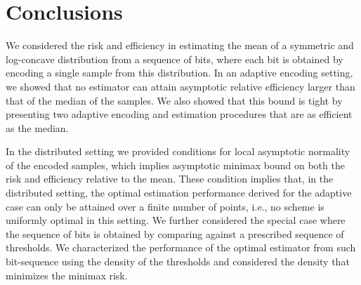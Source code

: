 \section{Conclusions \label{sec:conclusions}}
We considered the risk and efficiency in estimating the mean of a symmetric and log-concave distribution from a sequence of bits, where each bit is obtained by encoding a single sample from this distribution. 
%
In an adaptive encoding setting, we showed that no estimator can attain asymptotic relative efficiency larger than that of the median of the samples. We also showed that this bound is tight by presenting two adaptive encoding and estimation procedures that are as efficient as the median. 
\par
In the distributed setting we provided conditions for local asymptotic normality of the encoded samples, which implies asymptotic minimax bound on both the risk and efficiency relative to the mean. 
%
These condition implies that, in the distributed setting, the optimal estimation performance derived for the adaptive case can only be attained over a finite number of points, i.e., no scheme is uniformly optimal in this setting. 
%
We further considered the special case where the sequence of bits is obtained by comparing against a prescribed sequence of thresholds. We characterized the performance of the optimal estimator from such bit-sequence using the density of the thresholds and considered the density that minimizes the minimax risk. 
